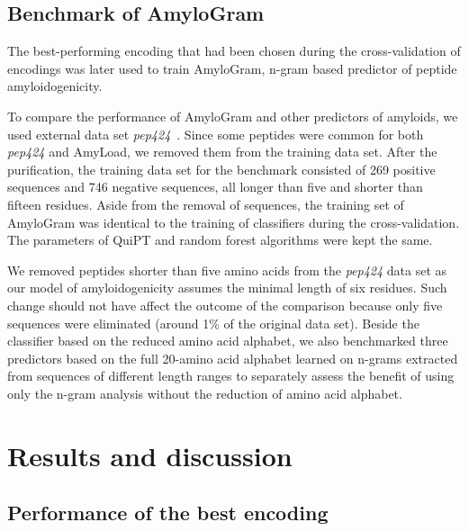 \documentclass[fleqn,10pt,twoside]{gcb15submission}
\begin{document}
\subsection{Benchmark of AmyloGram}

The best-performing encoding that had been chosen during the cross-validation of 
encodings was later used to train AmyloGram, n-gram based predictor of peptide 
amyloidogenicity.

  To compare the performance of AmyloGram and other predictors of amyloids, we 
used external data set \textit{pep424}~\citep{walsh_pasta_2014}. Since some 
peptides were common for both \textit{pep424} and AmyLoad, we removed them from 
the training data set. After the purification, the training data set for 
the benchmark consisted of 269 positive sequences and 746 negative 
sequences, all longer than five and shorter than fifteen residues. Aside from the 
removal of sequences, the training set of AmyloGram was identical to the training of
classifiers during the cross-validation. The parameters of QuiPT and random forest 
algorithms were kept the same. 

  We removed peptides shorter than five amino acids from the \textit{pep424} 
data set as our model of amyloidogenicity assumes the minimal length of six 
residues. Such change should not have affect the outcome of the comparison because 
only five sequences were eliminated (around 1\% of the original data set). 
Beside the classifier based on the reduced amino acid alphabet, we also 
benchmarked three predictors based on the full 20-amino acid alphabet learned on 
n-grams extracted from sequences of different length ranges to separately 
assess the benefit of using only the n-gram analysis without the reduction of 
amino acid alphabet.

\section{Results and discussion}


\subsection{Performance of the best encoding}
\end{document}
